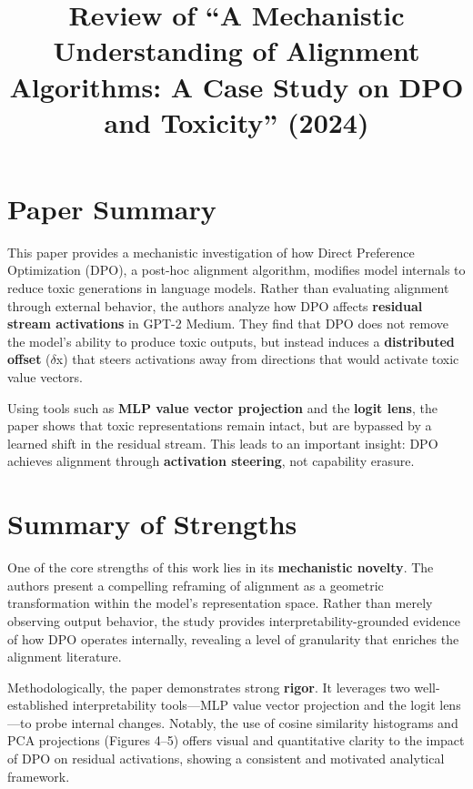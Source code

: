 \documentclass[10pt,a4paper]{article}
\title{\textbf{Review of ``A Mechanistic Understanding of Alignment Algorithms: A Case Study on DPO and Toxicity'' (2024)}}
\author{}
\date{}
\begin{document}
\maketitle
\thispagestyle{fancy}

\section{Paper Summary}
This paper provides a mechanistic investigation of how Direct Preference Optimization (DPO), a post-hoc alignment algorithm, modifies model internals to reduce toxic generations in language models. Rather than evaluating alignment through external behavior, the authors analyze how DPO affects \textbf{residual stream activations} in GPT-2 Medium. They find that DPO does not remove the model's ability to produce toxic outputs, but instead induces a \textbf{distributed offset} ($\delta$x) that steers activations away from directions that would activate toxic value vectors.

Using tools such as \textbf{MLP value vector projection} and the \textbf{logit lens}, the paper shows that toxic representations remain intact, but are bypassed by a learned shift in the residual stream. This leads to an important insight: DPO achieves alignment through \textbf{activation steering}, not capability erasure.

\vspace{1em}

\section{Summary of Strengths}
One of the core strengths of this work lies in its \textbf{mechanistic novelty}. The authors present a compelling reframing of alignment as a geometric transformation within the model's representation space. Rather than merely observing output behavior, the study provides interpretability-grounded evidence of how DPO operates internally, revealing a level of granularity that enriches the alignment literature.

Methodologically, the paper demonstrates strong \textbf{rigor}. It leverages two well-established interpretability tools---MLP value vector projection and the logit lens---to probe internal changes. Notably, the use of cosine similarity histograms and PCA projections (Figures 4--5) offers visual and quantitative clarity to the impact of DPO on residual activations, showing a consistent and motivated analytical framework.
\end{document}
